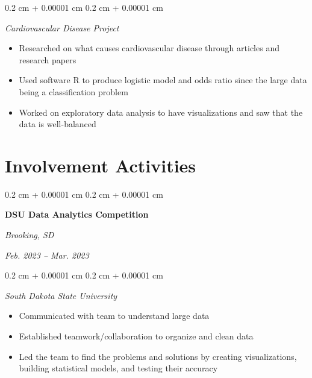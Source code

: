 \documentclass[10pt, letterpaper]{article}
\newenvironment{highlights}{
    \begin{itemize}[
        topsep=0.10 cm,
        parsep=0.10 cm,
        partopsep=0pt,
        itemsep=0pt,
        leftmargin=0.4 cm + 10pt
    ]
}{
    \end{itemize}
} %
\newenvironment{onecolentry}{
    \begin{adjustwidth}{
        0.2 cm + 0.00001 cm
    }{
        0.2 cm + 0.00001 cm
    }
}{
    \end{adjustwidth}
} %
\newenvironment{twocolentry}[2][]{
    \onecolentry
    \def\secondColumn{#2}
    \setcolumnwidth{\fill, 4.5 cm}
    \begin{paracol}{2}
}{
    \switchcolumn \raggedleft \secondColumn
    \end{paracol}
    \endonecolentry
} %
\begin{document}
        \vspace{0.2 cm}

        \begin{onecolentry}
        \textit{Cardiovascular Disease Project}
            \begin{highlights}
                \item Researched on what causes cardiovascular disease through articles and research papers
                \item Used software R to produce logistic model and odds ratio since the large data being a classification problem  
                \item Worked on exploratory data analysis to have visualizations and saw that the data is well-balanced
            \end{highlights}
        \end{onecolentry}


        \vspace{0.2 cm}


    
    \section{Involvement Activities}

 \begin{twocolentry}{
        \textit{Brooking, SD}    
            
        \textit{Feb. 2023 – Mar. 2023}}
            \textbf{DSU Data Analytics Competition}
            

        \end{twocolentry}

        \vspace{0.10 cm}

        \begin{onecolentry}
        \textit{South Dakota State University}
            \begin{highlights}
                \item Communicated with team to understand large data
                \item Established teamwork/collaboration to organize and clean data 
                \item Led the team to find the problems and solutions by creating visualizations, building statistical models, and testing their accuracy 
            \end{highlights}
        \end{onecolentry}
\end{document}

